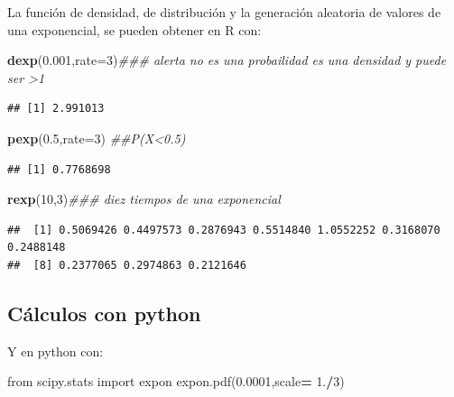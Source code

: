 \documentclass[]{book}
\newenvironment{Shaded}{\begin{snugshade}}{\end{snugshade}}
\newcommand{\CommentTok}[1]{\textcolor[rgb]{0.56,0.35,0.01}{\textit{#1}}}
\newcommand{\DataTypeTok}[1]{\textcolor[rgb]{0.13,0.29,0.53}{#1}}
\newcommand{\DecValTok}[1]{\textcolor[rgb]{0.00,0.00,0.81}{#1}}
\newcommand{\FloatTok}[1]{\textcolor[rgb]{0.00,0.00,0.81}{#1}}
\newcommand{\ImportTok}[1]{#1}
\newcommand{\KeywordTok}[1]{\textcolor[rgb]{0.13,0.29,0.53}{\textbf{#1}}}
\newcommand{\NormalTok}[1]{#1}
\newcommand{\OperatorTok}[1]{\textcolor[rgb]{0.81,0.36,0.00}{\textbf{#1}}}
\begin{document}
La función de densidad, de distribución y la generación aleatoria de valores de una exponencial, se pueden obtener en R con:

\begin{Shaded}
\begin{Highlighting}[]
\KeywordTok{dexp}\NormalTok{(}\FloatTok{0.001}\NormalTok{,}\DataTypeTok{rate=}\DecValTok{3}\NormalTok{)}\CommentTok{### alerta no es una probailidad es una densidad y puede ser >1}
\end{Highlighting}
\end{Shaded}

\begin{verbatim}
## [1] 2.991013
\end{verbatim}

\begin{Shaded}
\begin{Highlighting}[]
\KeywordTok{pexp}\NormalTok{(}\FloatTok{0.5}\NormalTok{,}\DataTypeTok{rate=}\DecValTok{3}\NormalTok{) }\CommentTok{##P(X<0.5)}
\end{Highlighting}
\end{Shaded}

\begin{verbatim}
## [1] 0.7768698
\end{verbatim}

\begin{Shaded}
\begin{Highlighting}[]
\KeywordTok{rexp}\NormalTok{(}\DecValTok{10}\NormalTok{,}\DecValTok{3}\NormalTok{)}\CommentTok{### diez tiempos de una exponencial}
\end{Highlighting}
\end{Shaded}

\begin{verbatim}
##  [1] 0.5069426 0.4497573 0.2876943 0.5514840 1.0552252 0.3168070 0.2488148
##  [8] 0.2377065 0.2974863 0.2121646
\end{verbatim}

\hypertarget{cuxe1lculos-con-python-17}{%
\subsection{Cálculos con python}\label{cuxe1lculos-con-python-17}}

Y en python con:

\begin{Shaded}
\begin{Highlighting}[]
\ImportTok{from}\NormalTok{ scipy.stats }\ImportTok{import}\NormalTok{ expon}
\NormalTok{expon.pdf(}\FloatTok{0.0001}\NormalTok{,scale}\OperatorTok{=} \FloatTok{1.}\OperatorTok{/}\DecValTok{3}\NormalTok{)}
\end{Highlighting}
\end{Shaded}
\end{document}

